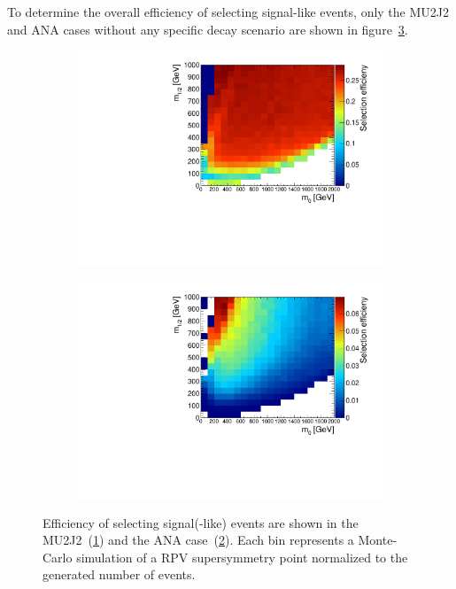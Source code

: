 To determine the overall efficiency of selecting signal-like events, only the MU2J2 and ANA cases without any specific decay scenario are shown in figure~\ref{fig:sigeff}.

\begin{figure}[ht!]
  \centering
  \begin{subfigure}[b]{0.495\textwidth}
    \centering
    \includegraphics[width=\textwidth]{plots/hSignalRatio.pdf}
    \caption{\label{fig:sig}}
  \end{subfigure}
  \begin{subfigure}[b]{0.495\textwidth}
    \centering
    \includegraphics[width=\textwidth]{plots/hCutSignalRatio.pdf}
    \caption{\label{fig:cutsig}}
  \end{subfigure}
  \caption{Efficiency of selecting signal(-like) events are shown in the MU2J2~(\ref{fig:sig}) and the ANA case~(\ref{fig:cutsig}). Each bin represents a Monte-Carlo simulation of a RPV supersymmetry point normalized to the generated number of events.}
  \label{fig:sigeff}
\end{figure}

